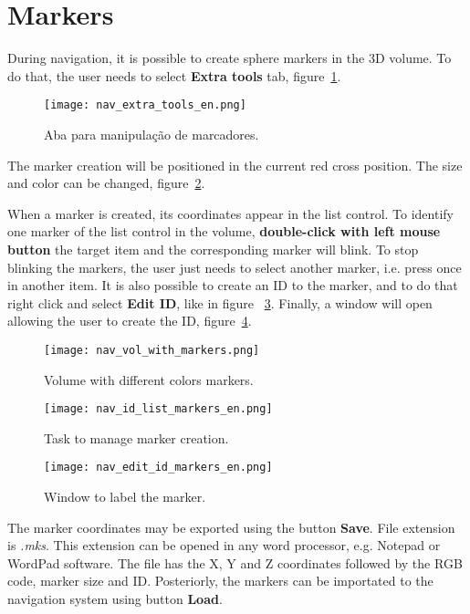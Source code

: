 \section{Markers}

During navigation, it is possible to create sphere markers in the 3D volume. To do that, the user needs to select
\textbf{Extra tools} tab, figure~\ref{fig:nav_extra_tools}.

\begin{figure}[!htb]
\centering
\texttt{[image: nav\_extra\_tools\_en.png]}
\caption{Aba para manipulação de marcadores.}
\label{fig:nav_extra_tools}
\end{figure}

The marker creation will be positioned in the current red cross position. The size and color can be
changed, figure~\ref{fig:nav_vol_with_markers}.

When a marker is created, its coordinates appear in the list control. To identify one marker of the list control in the
volume, \textbf{double-click with left mouse button} the target item and the corresponding marker will blink.
To stop blinking the markers, the user just needs to select another marker, i.e. press once in another item.
It is also possible to create an ID to the marker, and to do that right click and select \textbf{Edit ID}, like
in figure ~\ref{fig:nav_id_list_markers}. Finally, a window will open allowing the user to create
the ID, figure~\ref{fig:nav_edit_id_markers}.

\begin{figure}[!htb]
\centering
\texttt{[image: nav\_vol\_with\_markers.png]}
\caption{Volume with different colors markers.}
\label{fig:nav_vol_with_markers}
\end{figure} 

\begin{figure}[!htb]
\centering
\texttt{[image: nav\_id\_list\_markers\_en.png]}
\caption{Task to manage marker creation.}
\label{fig:nav_id_list_markers}
\end{figure} 

\begin{figure}[!htb]
\centering
\texttt{[image: nav\_edit\_id\_markers\_en.png]}
\caption{Window to label the marker.}
\label{fig:nav_edit_id_markers}
\end{figure} 

The marker coordinates may be exported using the button \textbf{Save}. File extension is \textit{.mks}. This extension can be
opened in any word processor, e.g. Notepad or WordPad software. The file has the X, Y and Z coordinates followed by the RGB code,
marker size and ID. Posteriorly, the markers can be importated to the navigation system using button \textbf{Load}.

